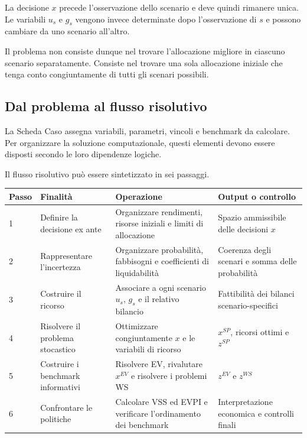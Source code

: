 La decisione \(x\) precede l'osservazione dello scenario e deve quindi
rimanere unica. Le variabili \(u_s\) e \(g_s\) vengono invece determinate
dopo l'osservazione di \(s\) e possono cambiare da uno scenario all'altro.

Il problema non consiste dunque nel trovare l'allocazione migliore in
ciascuno scenario separatamente. Consiste nel trovare una sola allocazione
iniziale che tenga conto congiuntamente di tutti gli scenari possibili.

\subsection{Dal problema al flusso risolutivo}

La Scheda Caso assegna variabili, parametri, vincoli e benchmark da
calcolare. Per organizzare la soluzione computazionale, questi elementi
devono essere disposti secondo le loro dipendenze logiche.

Il flusso risolutivo pu\`o essere sintetizzato in sei passaggi.

\begin{center}
\small
\begin{tabular}{p{0.8cm}p{3.0cm}p{4.1cm}p{3.6cm}}
\textbf{Passo} &
\textbf{Finalit\`a} &
\textbf{Operazione} &
\textbf{Output o controllo}
\\ \hline

1 &
Definire la decisione ex ante &
Organizzare rendimenti, risorse iniziali e limiti di allocazione &
Spazio ammissibile delle decisioni \(x\)
\\

2 &
Rappresentare l'incertezza &
Organizzare probabilit\`a, fabbisogni e coefficienti di liquidabilit\`a &
Coerenza degli scenari e somma delle probabilit\`a
\\

3 &
Costruire il ricorso &
Associare a ogni scenario \(u_s\), \(g_s\) e il relativo bilancio &
Fattibilit\`a dei bilanci scenario-specifici
\\

4 &
Risolvere il problema stocastico &
Ottimizzare congiuntamente \(x\) e le variabili di ricorso &
\(x^{SP}\), ricorsi ottimi e \(z^{SP}\)
\\

5 &
Costruire i benchmark informativi &
Risolvere EV, rivalutare \(x^{EV}\) e risolvere i problemi WS &
\(z^{EV}\) e \(z^{WS}\)
\\

6 &
Confrontare le politiche &
Calcolare VSS ed EVPI e verificare l'ordinamento dei benchmark &
Interpretazione economica e controlli finali
\end{tabular}
\end{center}

